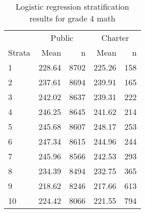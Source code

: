 \begin{table}[ht]
\centering
\caption{Logistic regression stratification results for grade 4 math} 
\label{g4math-circpsa10}
\begin{tabular}{lrr@{\extracolsep{.2cm}}rr}
  \hline
   & \multicolumn{2}{c}{Public} & \multicolumn{2}{c}{Charter} \\ \cline{2-3} \cline{4-5} Strata & Mean & n & Mean & n \\ \hline
1 & 228.64 & 8702 & 225.26 & 158 \\ 
  2 & 237.61 & 8694 & 239.91 & 165 \\ 
  3 & 242.02 & 8637 & 239.31 & 222 \\ 
  4 & 246.25 & 8645 & 241.62 & 214 \\ 
  5 & 245.68 & 8607 & 248.17 & 253 \\ 
  6 & 247.34 & 8615 & 244.96 & 244 \\ 
  7 & 245.96 & 8566 & 242.53 & 293 \\ 
  8 & 234.39 & 8494 & 232.75 & 365 \\ 
  9 & 218.62 & 8246 & 217.66 & 613 \\ 
  10 & 224.42 & 8066 & 221.55 & 794 \\ 
   \hline
\end{tabular}
\end{table}
